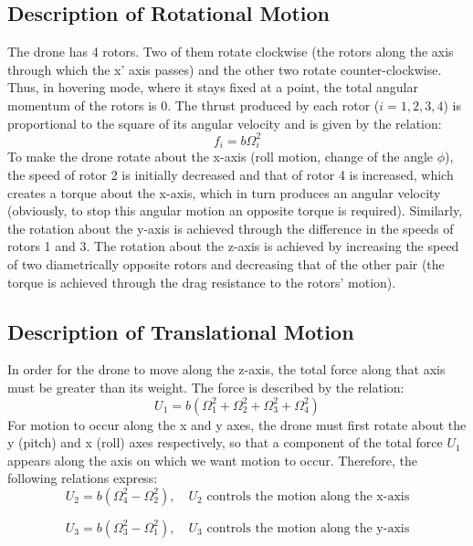 \documentclass[a4paper,12pt]{article}
\begin{document}
\subsection{Description of Rotational Motion}
The drone has 4 rotors. Two of them rotate clockwise (the rotors along the axis through which the x' axis passes) and the other two rotate counter-clockwise. Thus, in hovering mode, where it stays fixed at a point, the total angular momentum of the rotors is 0. The thrust produced by each rotor ($i=1,2,3,4$) is proportional to the square of its angular velocity and is given by the relation:
\begin{equation}
    f_i = b\Omega_i^2
\end{equation}
To make the drone rotate about the x-axis (roll motion, change of the angle $\phi$), the speed of rotor 2 is initially decreased and that of rotor 4 is increased, which creates a torque about the x-axis, which in turn produces an angular velocity (obviously, to stop this angular motion an opposite torque is required). Similarly, the rotation about the y-axis is achieved through the difference in the speeds of rotors 1 and 3. The rotation about the z-axis is achieved by increasing the speed of two diametrically opposite rotors and decreasing that of the other pair (the torque is achieved through the drag resistance to the rotors' motion).
\subsection{Description of Translational Motion}
In order for the drone to move along the z-axis, the total force along that axis must be greater than its weight. The force is described by the relation:
\begin{equation}
    U_1 = b(\Omega_1^2+\Omega_2^2+\Omega_3^2+\Omega_4^2)
\end{equation}
For motion to occur along the x and y axes, the drone must first rotate about the y (pitch) and x (roll) axes respectively, so that a component of the total force $U_1$ appears along the axis on which we want motion to occur. Therefore, the following relations express:
\begin{equation}
    U_2 = b(\Omega_4^2 - \Omega_2^2),  \quad \textrm{$U_2$ controls the motion along the x-axis}
\end{equation}

\begin{equation}
    U_3 = b(\Omega_3^2 - \Omega_1^2),  \quad \textrm{$U_3$ controls the motion along the y-axis}
\end{equation}
\end{document}
